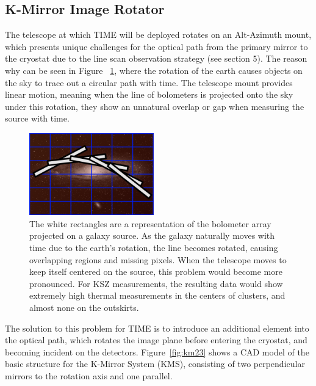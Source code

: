 \documentclass[manuscript]{aastex}
\begin{document}
\subsection{K-Mirror Image Rotator}
The telescope at which TIME will be deployed rotates on an Alt-Azimuth mount, which presents unique challenges for the optical path from the primary mirror to the cryostat due to the line scan observation strategy (see section 5). The reason why can be seen in Figure ~\ref{fig:km1}, where the rotation of the earth causes objects on the sky to trace out a circular path with time. The telescope mount provides linear motion, meaning when the line of bolometers is projected onto the sky under this rotation, they show an unnatural overlap or gap when measuring the source with time.
\begin{figure}
\vspace{-0.8cm}
  \begin{center}
    \includegraphics[width=0.48\textwidth]{km1.png}
  \end{center}
  \caption[Diagram of Bolometer De-rotation on Source from Alt-Az Mount.]{The white rectangles are a representation of the bolometer array projected on a galaxy source. As the galaxy naturally moves with time due to the earth's rotation, the line becomes rotated, causing overlapping regions and missing pixels. When the telescope moves to keep itself centered on the source, this problem would become more pronounced. For KSZ measurements, the resulting data would show extremely high thermal measurements in the centers of clusters, and almost none on the outskirts.}
  \label{fig:km1}
\end{figure}
The solution to this problem for TIME is to introduce an additional element into the optical path, which rotates the image plane before entering the cryostat, and becoming incident on the detectors. Figure~\ref{fig:km23} shows a CAD model of the basic structure for the K-Mirror System (KMS), consisting of two perpendicular mirrors to the rotation axis and one parallel.
\end{document}
